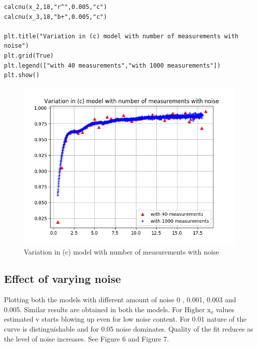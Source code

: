 \documentclass[a4paper]{article}
\begin{document}
\begin{lstlisting}
calcnu(x_2,18,"r^",0.005,"c")
calcnu(x_3,18,"b+",0.005,"c")

plt.title("Variation in (c) model with number of measurements with noise")
plt.grid(True)
plt.legend(["with 40 measurements","with 1000 measurements"])
plt.show()
\end{lstlisting}
\begin{figure}
\includegraphics[width=\columnwidth]{Figure_1-4b.png}
\caption{Variation in (c) model with number of measurements with noise}
\end{figure}
\subsection{Effect of varying noise}
Plotting both the models with different amount of noise 0 , 0.001, 0.003 and 0.005. Similar results are obtained in both the models. For Higher x$_{o}$ values estimated v starts blowing up even for low noise content. For 0.01 nature of the curve is distinguishable and for 0.05 noise dominates. Quality of the fit reduces as the level of noise increases.  See Figure 6 and Figure 7.
\end{document}
